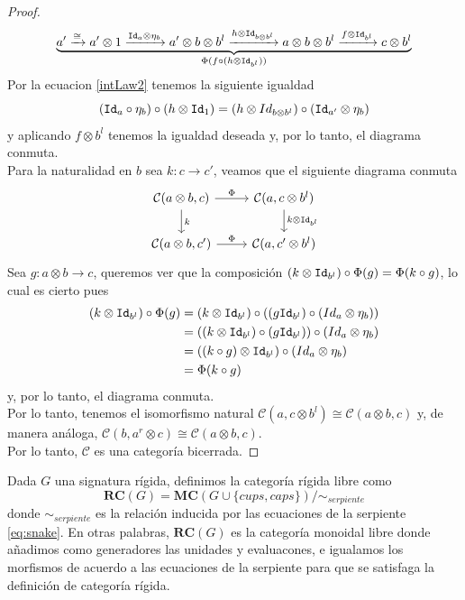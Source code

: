 \documentclass[../main.tex]{subfiles}
\begin{document}
\begin{proof}
        $$\underbrace{a' \xrightarrow[]{\cong} a' \otimes 1 \xrightarrow[]{\texttt{Id}_a \otimes \eta_b} a' \otimes b \otimes b^l \xrightarrow[]{h \otimes \texttt{Id}_{b \otimes b^l}} a \otimes b \otimes b^l \xrightarrow[]{f \otimes \texttt{Id}_{b^l}} c \otimes b^l}_{\Phi(f \circ (h \otimes \texttt{Id}_{b^l}))}$$
        Por la ecuacion \ref{intLaw2} tenemos la siguiente igualdad
        $$(\texttt{Id}_a \circ \eta_b) \circ (h \otimes \texttt{Id}_1) = (h \otimes Id_{b \otimes b^l}) \circ (\texttt{Id}_{a'} \otimes \eta_b)$$
        y aplicando $f \otimes b^l$ tenemos la igualdad deseada y, por lo tanto, el diagrama conmuta. \\
        Para la naturalidad en $b$ sea $k : c \to c'$, veamos que el siguiente diagrama conmuta
        \[
            \begin{tikzcd}
                \mathcal{C}(a \otimes b, c) \arrow{r}{\Phi} \arrow{d}{k} & \mathcal{C}(a,c \otimes b^l) \arrow{d}{k \otimes \id_{b^l}}\\
                \mathcal{C}(a \otimes b, c') \arrow{r}{\Phi} & \mathcal{C}(a,c' \otimes b^l)
            \end{tikzcd}
        \]
        Sea $g: a \otimes b \to c$, queremos ver que la composición $ (k \otimes \texttt{Id}_{b^l})\circ \Phi(g) = \Phi(k\circ g)$, lo cual es cierto pues
        \begin{align*}
            (k \otimes \texttt{Id}_{b^l}) \circ \Phi(g) &= (k \otimes \texttt{Id}_{b^l}) \circ ((g \texttt{Id}_{b^l}) \circ (Id_a \otimes \eta_b))  \\
            &= ((k \otimes \texttt{Id}_{b^l}) \circ (g \texttt{Id}_{b^l})) \circ (Id_a \otimes \eta_b) \\
            &= ((k \circ g) \otimes \texttt{Id}_{b^l}) \circ (Id_a \otimes \eta_b) \\
            &= \Phi(k \circ g)
        \end{align*}
        y, por lo tanto, el diagrama conmuta. \\
        Por lo tanto, tenemos el isomorfismo natural $\mathcal{C}(a,c\otimes b^l) \cong \mathcal{C}(a\otimes b, c)$ y, de manera análoga, $\mathcal{C}(b,a^r\otimes c) \cong \mathcal{C}(a\otimes b, c)$. \\
        Por lo tanto, $\mathcal{C}$ es una categoría bicerrada. 
    \end{proof}

    Dada $G$ una signatura rígida, definimos la categoría rígida libre como
    $$\textbf{RC}(G) = \textbf{MC}(G\cup \{ cups,caps \})/ \sim_{serpiente}$$
    donde $\sim_{serpiente}$ es la relación inducida por las ecuaciones de la serpiente \ref{eq:snake}. En otras palabras, $\textbf{RC}(G)$ es la categoría monoidal libre donde añadimos como generadores las unidades y evaluacones, e igualamos los morfismos de acuerdo a las ecuaciones de la serpiente para que se satisfaga la definición de categoría rígida. \\
\end{document}
